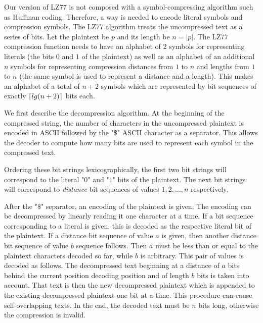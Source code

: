 \documentclass[a4paper, 11 pt, conference]{article}
\DeclarePairedDelimiter{\ceil}{\lceil}{\rceil}
\begin{document}
Our version of LZ77 is not composed with a symbol-compressing algorithm such as
Huffman coding. Therefore, a way is needed to encode literal symbols and
compression symbols. The LZ77 algorithm treats the uncompressed text as a
series of bits. Let the plaintext be $p$ and its length be $n = |p|$. The LZ77
compression function needs to have an alphabet of 2 symbols for representing
literals (the bits $0$ and $1$ of the plaintext) as well as an alphabet of an
additional $n$ symbols for representing compression distances from $1$ to $n$
and lengths from $1$ to $n$ (the same symbol is used to represent a distance
and a length). This makes an alphabet of a total of $n + 2$ symbols which are
represented by bit sequences of exactly $\ceil{lg(n + 2)}$ bits each.

We first describe the decompression algorithm. At the beginning of the
compressed string, the number of characters in the uncompressed plaintext is
encoded in ASCII followed by the "$\$$" ASCII character as a separator. This
allows the decoder to compute how many bits are used to represent each symbol
in the compressed text.

Ordering these bit strings lexicographically, the first two bit strings will
correspond to the literal "$0$" and "$1$" bits of the plaintext. The next bit
strings will correspond to \textit{distance} bit sequences of values $1, 2,
\ldots, n$ respectively.

After the "$\$$" separator, an encoding of the plaintext is given. The encoding
can be decompressed by linearly reading it one character at a time. If a bit
sequence corresponding to a literal is given, this is decoded as the respective
literal bit of the plaintext. If a distance bit sequence of value $a$ is given,
then another distance bit sequence of value $b$ sequence follows.  Then $a$
must be less than or equal to the plaintext characters decoded so far, while
$b$ is arbitrary. This pair of values is decoded as follows. The decompressed
text beginning at a distance of $a$ bits behind the current position decoding
position and of length $b$ bits is taken into account. That text is then the
new decompressed plaintext which is appended to the existing decompressed
plaintext one bit at a time. This procedure can cause self-overlapping texts.
In the end, the decoded text must be $n$ bits long, otherwise the compression
is invalid.
\end{document}

